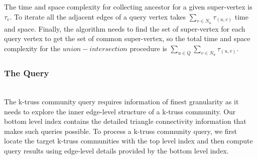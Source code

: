 %

The time and space complexity for collecting ancestor for a given super-vertex is $\tau_e$. To iterate all the adjacent edges of a query vertex takes $\sum_{v \in N_u}{\tau_{(u,v)}}$ time and space. Finally, the algorithm needs to find the set of super-vertex for each query vertex to get the set of common super-vertex, so the total time and space complexity for the $union-intersection$ procedure is $\sum_{u \in Q}{\sum_{v \in N_u}{\tau_{(u,v)}}}$. 

\subsubsection{The \BottomLevelProb{} Query}
\label{\bottomlevelprob{}}

~\\The \bottomlevelprob{} k-truss community query requires information of finest granularity as it needs to explore the inner edge-level structure of a k-truss community. Our bottom level index contains the detailed triangle connectivity information that makes such queries possible. To process a k-truss community query, we first locate the target k-truss communities with the top level index and then compute query results using edge-level details provided by the bottom level index. 

